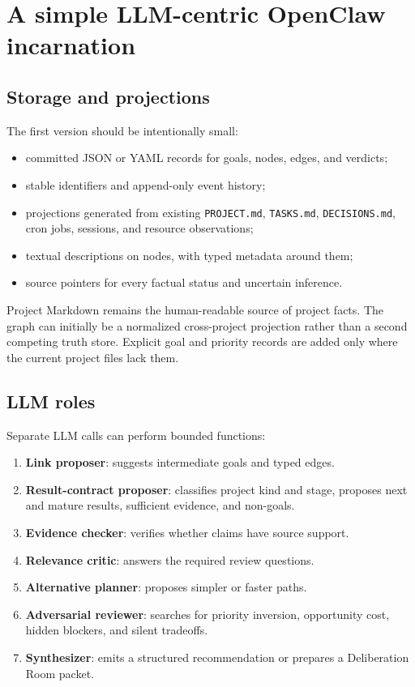 \documentclass[11pt,letterpaper]{article}
\newcommand{\term}[1]{\textbf{#1}}
\begin{document}
\section{A simple LLM-centric OpenClaw incarnation}

\subsection{Storage and projections}

The first version should be intentionally small:

\begin{itemize}
  \item committed JSON or YAML records for goals, nodes, edges, and verdicts;
  \item stable identifiers and append-only event history;
  \item projections generated from existing \texttt{PROJECT.md},
        \texttt{TASKS.md}, \texttt{DECISIONS.md}, cron jobs, sessions, and
        resource observations;
  \item textual descriptions on nodes, with typed metadata around them;
  \item source pointers for every factual status and uncertain inference.
\end{itemize}

Project Markdown remains the human-readable source of project facts. The graph
can initially be a normalized cross-project projection rather than a second
competing truth store. Explicit goal and priority records are added only where
the current project files lack them.

\subsection{LLM roles}

Separate LLM calls can perform bounded functions:

\begin{enumerate}
  \item \term{Link proposer}: suggests intermediate goals and typed edges.
  \item \term{Result-contract proposer}: classifies project kind and stage,
        proposes next and mature results, sufficient evidence, and non-goals.
  \item \term{Evidence checker}: verifies whether claims have source support.
  \item \term{Relevance critic}: answers the required review questions.
  \item \term{Alternative planner}: proposes simpler or faster paths.
  \item \term{Adversarial reviewer}: searches for priority inversion,
        opportunity cost, hidden blockers, and silent tradeoffs.
  \item \term{Synthesizer}: emits a structured recommendation or prepares a
        Deliberation Room packet.
\end{enumerate}
\end{document}
